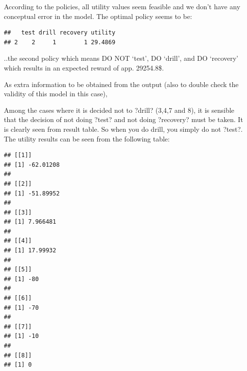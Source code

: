 \documentclass[
]{article}
\newenvironment{Shaded}{\begin{snugshade}}{\end{snugshade}}
\newcommand{\ControlFlowTok}[1]{\textcolor[rgb]{0.13,0.29,0.53}{\textbf{#1}}}
\newcommand{\FunctionTok}[1]{\textcolor[rgb]{0.00,0.00,0.00}{#1}}
\newcommand{\NormalTok}[1]{#1}
\newcommand{\SpecialCharTok}[1]{\textcolor[rgb]{0.00,0.00,0.00}{#1}}
\newcommand{\StringTok}[1]{\textcolor[rgb]{0.31,0.60,0.02}{#1}}
\begin{document}
According to the policies, all utility values seem feasible and we don't have any conceptual error in the model.
The optimal policy seems to be:

\begin{Shaded}
\end{Shaded}

\begin{verbatim}
##   test drill recovery utility
## 2    2     1        1 29.4869
\end{verbatim}

..the second policy which means DO NOT `test', DO `drill', and DO `recovery' which results in an expected reward of app. 29254.8\$.

As extra information to be obtained from the output (also to double check the validity of this model in this case),

Among the cases where it is decided not to ?drill? (3,4,7 and 8), it is sensible that the decision of not doing ?test? and not doing ?recovery? must be taken. It is clearly seen from result table.
So when you do drill, you simply do not ?test?. The utility results can be seen from the following table:

\begin{Shaded}
\end{Shaded}

\begin{verbatim}
## [[1]]
## [1] -62.01208
## 
## [[2]]
## [1] -51.89952
## 
## [[3]]
## [1] 7.966481
## 
## [[4]]
## [1] 17.99932
## 
## [[5]]
## [1] -80
## 
## [[6]]
## [1] -70
## 
## [[7]]
## [1] -10
## 
## [[8]]
## [1] 0
\end{verbatim}

\begin{Shaded}
\end{Shaded}
\end{document}
